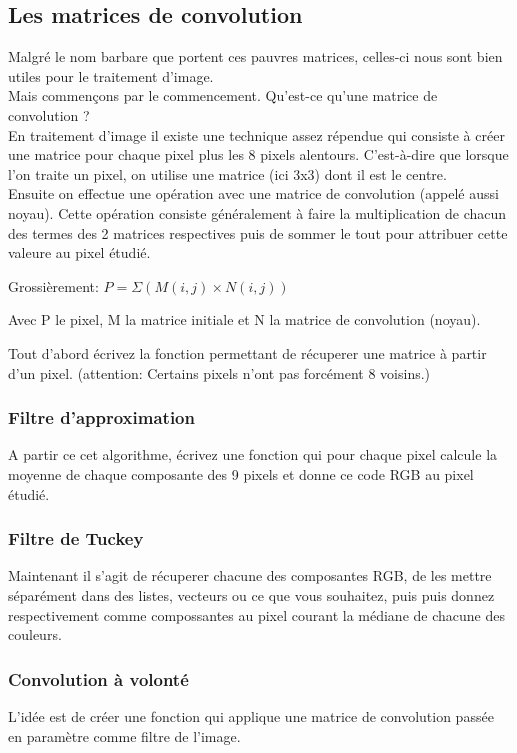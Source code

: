\documentclass[a4paper]{article}
\begin{document}
\subsection{Les matrices de convolution}
Malgré le nom barbare que portent ces pauvres matrices, celles-ci nous sont bien utiles pour le traitement d'image.\\
Mais commençons par le commencement. Qu'est-ce qu'une matrice de convolution ?\\
En traitement d'image il existe une technique assez répendue qui consiste à créer une matrice pour chaque pixel plus les 8 pixels alentours.
C'est-à-dire que lorsque l'on traite un pixel, on utilise une matrice (ici 3x3) dont il est le centre.\\
Ensuite on effectue une opération avec une matrice de convolution (appelé aussi noyau). Cette opération consiste généralement 
à faire la multiplication de chacun des termes des 2 matrices respectives puis de sommer le tout pour attribuer cette valeure au pixel étudié.\par\smallskip
Grossièrement: 	\begin{math}
		P = \Sigma ( M(i,j) \times  N(i,j) )
		\end{math} \par\smallskip
Avec P le pixel, M la matrice initiale et N la matrice de convolution (noyau).\par\bigskip

Tout d'abord écrivez la fonction permettant de récuperer une matrice à partir d'un pixel.
(attention: Certains pixels n'ont pas forcément 8 voisins.)

\subsubsection{Filtre d'approximation}
A partir ce cet algorithme, écrivez une fonction qui pour chaque pixel calcule la moyenne de chaque composante des 9 pixels et donne ce code RGB au pixel étudié.
\subsubsection{Filtre de Tuckey}
Maintenant il s'agit de récuperer chacune des composantes RGB, de les mettre séparément dans des listes, 
vecteurs ou ce que vous souhaitez, puis puis donnez respectivement comme compossantes au pixel courant la médiane de chacune des couleurs.
\subsubsection{Convolution à volonté}
L'idée est de créer une fonction qui applique une matrice de convolution passée en paramètre comme filtre de l'image.
\end{document}
